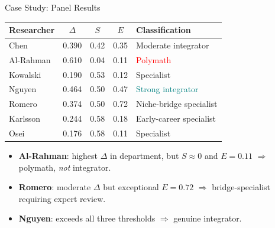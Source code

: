 \documentclass[aspectratio=169,10pt]{beamer}
\begin{document}
\begin{frame}{Case Study: Panel Results}
\begin{table}
\centering
\begin{tabular}{@{}l ccc l@{}}
\toprule
\textbf{Researcher} & $\Delta$ & $S$ & $E$ & \textbf{Classification} \\
\midrule
Chen      & 0.390 & 0.42 & 0.35 & Moderate integrator \\
Al-Rahman & 0.610 & 0.04 & 0.11 & \textcolor{red}{Polymath} \\
Kowalski  & 0.190 & 0.53 & 0.12 & Specialist \\
Nguyen    & 0.464 & 0.50 & 0.47 & \textcolor{teal}{Strong integrator} \\
Romero    & 0.374 & 0.50 & 0.72 & Niche-bridge specialist \\
Karlsson  & 0.244 & 0.58 & 0.18 & Early-career specialist \\
Osei      & 0.176 & 0.58 & 0.11 & Specialist \\
\bottomrule
\end{tabular}
\end{table}
\medskip
\begin{itemize}
  \item \textbf{Al-Rahman}: highest $\Delta$ in department, but $S \approx 0$
        and $E = 0.11$ $\Rightarrow$ polymath, \emph{not} integrator.
  \item \textbf{Romero}: moderate $\Delta$ but exceptional $E = 0.72$
        $\Rightarrow$ bridge-specialist requiring expert review.
  \item \textbf{Nguyen}: exceeds all three thresholds $\Rightarrow$
        genuine integrator.
\end{itemize}
\end{frame}
\end{document}
